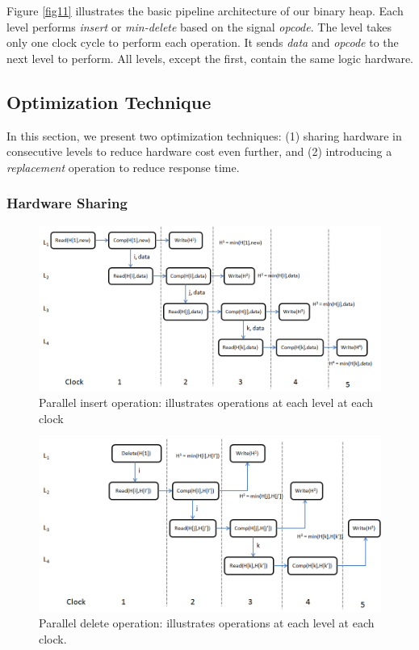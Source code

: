 \documentclass[10pt, conference, compsocconf]{IEEEtran}
\begin{document}
Figure \ref{fig11} illustrates the basic pipeline architecture of our binary heap.
Each level performs {\it insert} or {\it min-delete} based on the signal {\it opcode}.
The level takes only one clock cycle to perform each operation.
It sends {\it data} and {\it opcode} to the next level to perform.
All levels, except the first, contain the same logic hardware.


\subsection{Optimization Technique}

In this section, we present two optimization techniques: (1) sharing hardware in consecutive levels to reduce hardware cost even further, and (2) introducing a {\it replacement} operation to reduce response time.

\subsubsection{Hardware Sharing}

\begin{figure}[!ht]
  \centering
  \includegraphics[width=12cm]{Figures/clock1.png}
      \caption{Parallel insert operation: illustrates operations at each level at each clock }
    \label{clock1}
\end{figure}

\begin{figure}[!ht]
  \centering
  \includegraphics[width=12cm]{Figures/clock2.png}
      \caption{Parallel delete operation: illustrates operations at each level at each clock.  }
    \label{clock2}
\end{figure}
\end{document}
